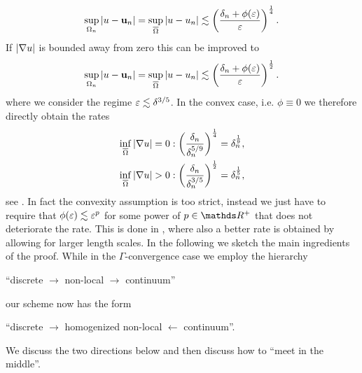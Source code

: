 %
%
\begin{align*}
\sup_{\Omega_n}\left|u-\mathbf{u}_n\right|
=
\sup_{\overline{\Omega}}\left|u-u_n\right| 
\lesssim\left(\frac{\delta_n + \phi(\varepsilon)}{\varepsilon}\right)^\frac{1}{4}.
\end{align*}
%
%
If $\left|\nabla u\right|$ is bounded away from zero this can be improved to 
%
\begin{align*}
\sup_{\Omega_n}\left|u-\mathbf{u}_n\right| 
=
\sup_{\overline{\Omega}}\left|u-u_n\right| 
\lesssim \left(\frac{\delta_n + \phi(\varepsilon)}{\varepsilon}\right)^\frac{1}{2}.
\end{align*}
%
where we consider the regime $\varepsilon\lesssim\delta^{3/5}$. In the convex case, i.e. $\phi\equiv 0$ we therefore directly obtain the rates
%
\begin{align*}
\inf_{\overline{\Omega}}\left|\nabla u\right| = 0 &:
\left(\frac{\delta_n}{\delta_n^{5/9}}\right)^{\frac{1}{4}} = \delta_n^{\frac{1}{9}},\\
\inf_{\overline{\Omega}}\left|\nabla u\right| > 0 &:
\left(\frac{\delta_n}{\delta_n^{3/5}}\right)^{\frac{1}{2}} = \delta_n^{\frac{1}{5}},
\end{align*}
%
see \cite[Cor. 2.4]{bungert2021uniform}. In fact the convexity assumption is too strict, instead we just have to require that $\phi(\varepsilon)\lesssim \varepsilon^p$ for some power of $p\in\R^+$ that does not deteriorate the rate. This is done in \cite[Cor. 2.5, 2.6]{bungert2021uniform}, where also a better rate is obtained by allowing for larger length scales. In the following we sketch the main ingredients of the proof. While in the $\Gamma$-convergence case we employ the hierarchy
%
\begin{center}
\enquote{discrete $\to$ non-local $\to$ continuum}
\end{center} 
%
%
our scheme now has the form
%
\begin{center}
\enquote{discrete $\to$ homogenized non-local $\leftarrow$ continuum}.
\end{center}
%
We discuss the two directions below and then discuss how to \enquote{meet in the middle}.
%
